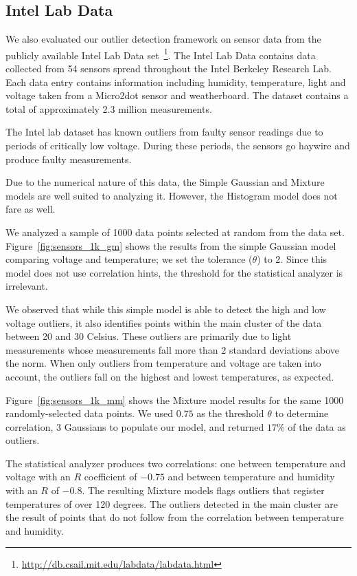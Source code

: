 \subsection{Intel Lab Data}
\label{sec:intel-lab-data-evaluation}

We also evaluated our outlier detection framework on sensor data from the publicly available Intel Lab Data set~\footnote{\url{http://db.csail.mit.edu/labdata/labdata.html}}. The Intel Lab Data contains data collected from 54 sensors spread throughout the Intel Berkeley Research Lab. Each data entry contains information including humidity, temperature, light and voltage taken from a Micro2dot sensor and weatherboard. The dataset contains a total of approximately 2.3 million measurements.

The Intel lab dataset has known outliers from faulty sensor readings due to periods of critically low voltage. During these periods, the sensors go haywire and produce faulty measurements.

Due to the numerical nature of this data, the Simple Gaussian and Mixture models are well suited to analyzing it. However, the Histogram model does not fare as well.

We analyzed a sample of 1000 data points selected at random from the data set. Figure~\ref{fig:sensors_1k_gm} shows the results from the simple Gaussian model comparing voltage and temperature; we set the tolerance ($\theta$) to 2. Since this model does not use correlation hints, the threshold for the statistical analyzer is irrelevant.

We observed that while this simple model is able to detect the high and low voltage outliers, it also identifies points within the main cluster of the data between 20 and 30 Celsius. These outliers are primarily due to light measurements whose measurements fall more than 2 standard deviations above the norm. When only outliers from temperature and voltage are taken into account, the outliers fall on the highest and lowest temperatures, as expected.

Figure~\ref{fig:sensors_1k_mm} shows the Mixture model results for the same 1000 randomly-selected data points. We used $0.75$ as the threshold $\theta$ to determine correlation, 3 Gaussians to populate our model, and returned $17\%$ of the data as outliers.

The statistical analyzer produces two correlations: one between temperature and voltage with an $R$ coefficient of $-0.75$ and between temperature and humidity with an $R$ of $-0.8$. The resulting Mixture models flags outliers that register temperatures of over 120 degrees. The outliers detected in the main cluster are the result of points that do not follow from the correlation between temperature and humidity.

